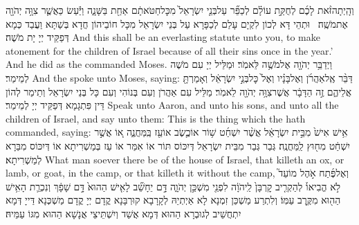 {וְהָֽיְתָה\maqqaf זֹּ֨את לָכֶ֜ם לְחֻקַּ֣ת עוֹלָ֗ם לְכַפֵּ֞ר עַל\maqqaf בְּנֵ֤י יִשְׂרָאֵל֙ מִכׇּל\maqqaf חַטֹּאתָ֔ם אַחַ֖ת בַּשָּׁנָ֑ה וַיַּ֕עַשׂ כַּאֲשֶׁ֛ר צִוָּ֥ה יְהֹוָ֖ה אֶת\maqqaf מֹשֶֽׁה׃ \petucha }
{וּתְהֵי דָּא לְכוֹן לִקְיָם עָלַם לְכַפָּרָא עַל בְּנֵי יִשְׂרָאֵל מִכָּל חוֹבֵיהוֹן חֲדָא בְּשַׁתָּא וַעֲבַד כְּמָא דְּפַקֵּיד יְיָ יָת מֹשֶׁה׃}
{And this shall be an everlasting statute unto you, to make atonement for the children of Israel because of all their sins once in the year.’ And he did as the \lord\space commanded Moses.}{}
\newperek
{}
{וַיְדַבֵּ֥ר יְהֹוָ֖ה אֶל\maqqaf מֹשֶׁ֥ה לֵּאמֹֽר׃}
{וּמַלֵּיל יְיָ עִם מֹשֶׁה לְמֵימַר׃}
{And the \lord\space spoke unto Moses, saying:}{}
{דַּבֵּ֨ר אֶֽל\maqqaf אַהֲרֹ֜ן וְאֶל\maqqaf בָּנָ֗יו וְאֶל֙ כׇּל\maqqaf בְּנֵ֣י יִשְׂרָאֵ֔ל וְאָמַרְתָּ֖ אֲלֵיהֶ֑ם זֶ֣ה הַדָּבָ֔ר אֲשֶׁר\maqqaf צִוָּ֥ה יְהֹוָ֖ה לֵאמֹֽר׃}
{מַלֵּיל עִם אַהֲרֹן וְעִם בְּנוֹהִי וְעִם כָּל בְּנֵי יִשְׂרָאֵל וְתֵימַר לְהוֹן דֵּין פִּתְגָמָא דְּפַקֵּיד יְיָ לְמֵימַר׃}
{Speak unto Aaron, and unto his sons, and unto all the children of Israel, and say unto them: This is the thing which the \lord\space hath commanded, saying:}{}
{אִ֥ישׁ אִישׁ֙ מִבֵּ֣ית יִשְׂרָאֵ֔ל אֲשֶׁ֨ר יִשְׁחַ֜ט שׁ֥וֹר אוֹ\maqqaf כֶ֛שֶׂב אוֹ\maqqaf עֵ֖ז בַּֽמַּחֲנֶ֑ה א֚וֹ אֲשֶׁ֣ר יִשְׁחַ֔ט מִח֖וּץ לַֽמַּחֲנֶֽה׃}
{גְּבַר גְּבַר מִבֵּית יִשְׂרָאֵל דְּיִכּוֹס תּוֹר אוֹ אִמַּר אוֹ עֵז בְּמַשְׁרִיתָא אוֹ דְּיִכּוֹס מִבַּרָא לְמַשְׁרִיתָא׃}
{What man soever there be of the house of Israel, that killeth an ox, or lamb, or goat, in the camp, or that killeth it without the camp,}{}
{וְאֶל\maqqaf פֶּ֜תַח אֹ֣הֶל מוֹעֵד֮ לֹ֣א הֱבִיאוֹ֒ לְהַקְרִ֤יב קׇרְבָּן֙ לַֽיהֹוָ֔ה לִפְנֵ֖י מִשְׁכַּ֣ן יְהֹוָ֑ה דָּ֣ם יֵחָשֵׁ֞ב לָאִ֤ישׁ הַהוּא֙ דָּ֣ם שָׁפָ֔ךְ וְנִכְרַ֛ת הָאִ֥ישׁ הַה֖וּא מִקֶּ֥רֶב עַמּֽוֹ׃}
{וְלִתְרַע מַשְׁכַּן זִמְנָא לָא אַיְתְיֵהּ לְקָרָבָא קוּרְבָּנָא קֳדָם יְיָ קֳדָם מַשְׁכְּנָא דַּייָ דְּמָא יִתְחֲשֵׁיב לְגוּבְרָא הַהוּא דְּמָא אֲשַׁד וְיִשְׁתֵּיצֵי אֲנָשָׁא הַהוּא מִגּוֹ עַמֵּיהּ׃}
